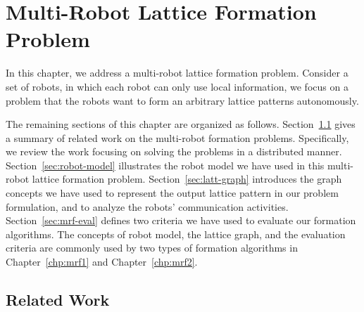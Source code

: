 \chapter{Multi-Robot Lattice Formation Problem}
\label{chp:mrf}

In this chapter, we address a multi-robot lattice formation problem.
%
Consider a set of robots, in which each
robot can only use local information, 
we focus on a problem that the robots want to form an arbitrary lattice patterns autonomously.


The remaining sections of this chapter are organized as follows. 
%
Section~\ref{sec:related-mrf} gives a summary of related work on the multi-robot formation problems.
%
Specifically, we review the work focusing on solving the problems in a distributed manner. 
%
Section~\ref{sec:robot-model} illustrates the robot model we have used in this multi-robot lattice formation problem.
%
Section~\ref{sec:latt-graph} introduces the graph concepts we have used to represent the output lattice pattern in our problem formulation, and to analyze the robots' communication activities. 
%
Section~\ref{sec:mrf-eval} defines two criteria we have used to evaluate our formation algorithms.
%
The concepts of robot model, the lattice graph, and the evaluation criteria are commonly used by two types of formation algorithms in Chapter~\ref{chp:mrf1} and Chapter~\ref{chp:mrf2}.

\section{Related Work}
\label{sec:related-mrf}

